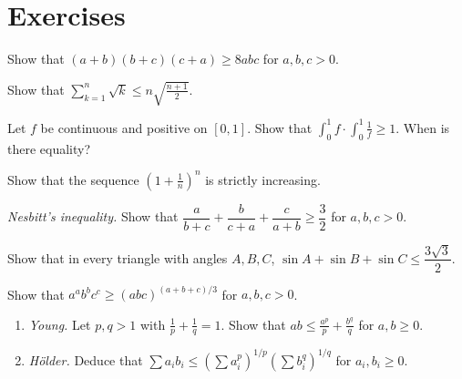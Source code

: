 \section{Exercises}

\begin{exercise}[$\star$]\label{ex:8abc}
Show that $(a+b)(b+c)(c+a)\ge8abc$ for $a,b,c>0$.
\end{exercise}

\begin{exercise}[$\star$]\label{ex:sqrtk}
Show that $\displaystyle\sum_{k=1}^n\sqrt k\le n\sqrt{\frac{n+1}2}$.
\end{exercise}

\begin{exercise}[$\star$]\label{ex:intcs}
Let $f$ be continuous and positive on $[0,1]$. Show that $\displaystyle\int_0^1f\cdot\int_0^1\frac1f\ge1$. When is there equality?
\end{exercise}

\begin{exercise}[$\star\star$]\label{ex:euler}
Show that the sequence $\left(1+\frac1n\right)^n$ is strictly increasing.
\end{exercise}

\begin{exercise}[$\star\star$]\label{ex:nesbitt}
\emph{Nesbitt's inequality.} Show that $\dfrac a{b+c}+\dfrac b{c+a}+\dfrac c{a+b}\ge\dfrac32$ for $a,b,c>0$.
\end{exercise}

\begin{exercise}[$\star\star$]\label{ex:triangle}
Show that in every triangle with angles $A,B,C$, $\sin A+\sin B+\sin C\le\dfrac{3\sqrt3}2$.
\end{exercise}

\begin{exercise}[$\star\star$]\label{ex:aabbcc}
Show that $a^ab^bc^c\ge(abc)^{(a+b+c)/3}$ for $a,b,c>0$.
\end{exercise}

\begin{exercise}[$\star\star$]\label{ex:holder}
\begin{enumerate}[label=(\alph*)]
\item \emph{Young.} Let $p,q>1$ with $\frac1p+\frac1q=1$. Show that $ab\le\frac{a^p}p+\frac{b^q}q$ for $a,b\ge0$.
\item \emph{H\"older.} Deduce that $\sum a_ib_i\le\left(\sum a_i^p\right)^{1/p}\left(\sum b_i^q\right)^{1/q}$ for $a_i,b_i\ge0$.
\end{enumerate}
\end{exercise}

